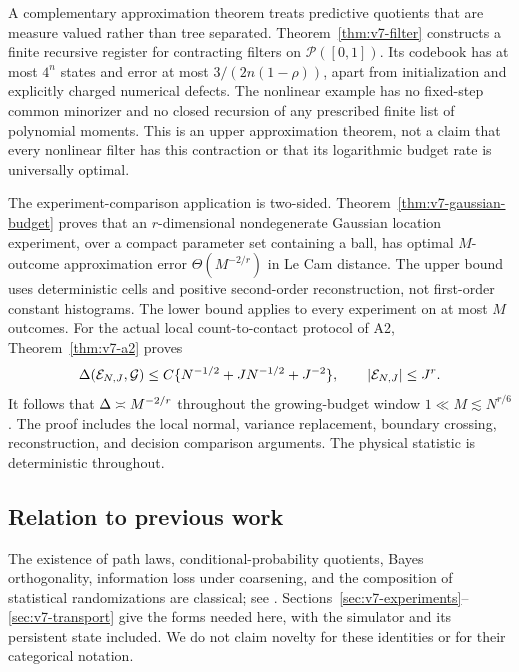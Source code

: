 A complementary approximation theorem treats predictive quotients that
are measure valued rather than tree separated.
Theorem~\ref{thm:v7-filter} constructs a finite recursive register for
contracting filters on $\mathcal P([0,1])$. Its codebook has at most
$4^n$ states and error at most $3/(2n(1-\rho))$, apart from initialization
and explicitly charged numerical defects. The nonlinear example has no
fixed-step common minorizer and no closed recursion of any prescribed
finite list of polynomial moments. This is an upper approximation
theorem, not a claim that every nonlinear filter has this contraction or
that its logarithmic budget rate is universally optimal.

The experiment-comparison application is two-sided.
Theorem~\ref{thm:v7-gaussian-budget} proves that an $r$-dimensional
nondegenerate Gaussian location experiment, over a compact parameter
set containing a ball, has optimal $M$-outcome approximation error
$\Theta(M^{-2/r})$ in Le Cam distance. The upper bound uses deterministic
cells and positive second-order reconstruction, not first-order constant
histograms. The lower bound applies to every experiment on at most $M$
outcomes. For the actual local count-to-contact protocol of A2,
Theorem~\ref{thm:v7-a2} proves
\[
 \Delta(\mathcal E_{N,J},\mathcal G)
 \le C\{N^{-1/2}+J N^{-1/2}+J^{-2}\},\qquad
 |\mathcal E_{N,J}|\le J^r.
\]
It follows that $\Delta\asymp M^{-2/r}$ throughout the growing-budget
window $1\ll M\lesssim N^{r/6}$. The proof includes the local normal,
variance replacement, boundary crossing, reconstruction, and decision
comparison arguments. The physical statistic is deterministic throughout.

\subsection{Relation to previous work}
The existence of path laws, conditional-probability quotients, Bayes
orthogonality, information loss under coarsening, and the composition of
statistical randomizations are classical; see
\cite{Kallenberg2021,Blackwell1953,LeCamYang2000,Torgersen1991}.
Sections~\ref{sec:v7-experiments}--\ref{sec:v7-transport} give the forms
needed here, with the simulator and its persistent state included. We do
not claim novelty for these identities or for their categorical notation.

